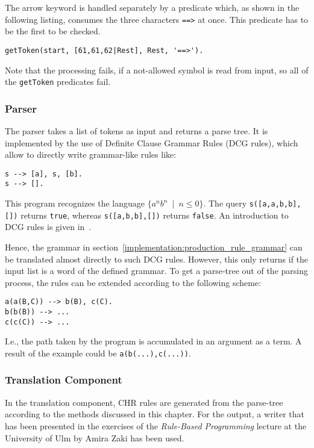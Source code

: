 The arrow keyword is handled separately by a predicate which, as shown in the following listing, consumes the three characters \lstinline|==>| at once. This predicate has to be the first to be checked.

\begin{lstlisting}
getToken(start, [61,61,62|Rest], Rest, '==>').
\end{lstlisting}

Note that the processing fails, if a not-allowed symbol is read from input, so all of the \lstinline|getToken| predicates fail.

\subsubsection{Parser}

The parser takes a list of tokens as input and returns a parse tree. It is implemented by the use of Definite Clause Grammar Rules (DCG rules), which allow to directly write grammar-like rules like:

\begin{lstlisting}
s --> [a], s, [b].
s --> [].
\end{lstlisting}

This program recognizes the language $\{ a^nb^n \enspace | \enspace n \leq 0 \}$. The query \lstinline|s([a,a,b,b],[])| returns \lstinline|true|, whereas \lstinline|s([a,b,b],[])| returns \lstinline|false|. An introduction to DCG rules is given in~\cite{ogb_dcg}.

Hence, the grammar in section~\ref{implementation:production_rule_grammar} can be translated almost directly to such DCG rules. However, this only returns if the input list is a word of the defined grammar. To get a parse-tree out of the parsing process, the rules can be extended according to the following scheme:

\begin{lstlisting}
a(a(B,C)) --> b(B), c(C).
b(b(B)) --> ...
c(c(C)) --> ...
\end{lstlisting}

I.e., the path taken by the program is accumulated in an argument as a term. A result of the example could be \lstinline|a(b(...),c(...))|.

\subsubsection{Translation Component}

In the translation component, CHR rules are generated from the parse-tree according to the methods discussed in this chapter. For the output, a writer that has been presented in the exercises of the \emph{Rule-Based Programming} lecture at the University of Ulm by Amira Zaki \cite{chr_homepage} has been used.

